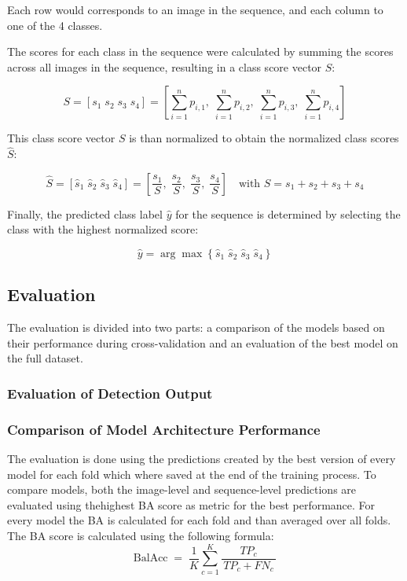     Each row would corresponds to an image in the sequence, and each column to one of the 4 classes.

    The scores for each class in the sequence were calculated by summing the scores across all images in the sequence, resulting in a class score vector \( S \):

    \begin{equation}
    S = [s_1\; s_2\; s_3\; s_4] = \left[ \sum_{i=1}^n p_{i,1},\; \sum_{i=1}^n p_{i,2},\; \sum_{i=1}^n p_{i,3},\; \sum_{i=1}^n p_{i,4} \right]
    \label{eq:class_score_vector}
    \end{equation}

    This class score vector \( S \) is than normalized to obtain the normalized class scores \( \hat{S} \):

    \begin{equation}
    \hat{S} = [\hat{s}_1\; \hat{s}_2\; \hat{s}_3\; \hat{s}_4] = \left[ \frac{s_1}{S},\; \frac{s_2}{S},\; \frac{s_3}{S},\; \frac{s_4}{S} \right]
    \quad \text{with } S = s_1 + s_2 + s_3 + s_4
    \label{eq:normalized_class_scores}
    \end{equation}


    Finally, the predicted class label \( \hat{y} \) for the sequence is determined by selecting the class with the highest normalized score:

    \begin{equation}
    \hat{y} = \arg\max \left\{\hat{s}_1\; \hat{s}_2\; \hat{s}_3\; \hat{s}_4\right\}
    \label{eq:predicted_sequence_label}
    \end{equation}

    \subsection{Evaluation}
    The evaluation is divided into two parts: a comparison of the models based on their performance during cross-validation and an evaluation of the best model on the full dataset.

    \subsubsection{Evaluation of Detection Output}

    \subsubsection{Comparison of Model Architecture Performance}
    The evaluation is done using the predictions created by the best version of every model for each fold which where saved at the end of the training process.
    To compare models, both the image-level and sequence-level predictions are evaluated using thehighest \ac{BA} score as metric for the best performance.
    For every model the \ac{BA} is calculated for each fold and than averaged over all folds.
    The \ac{BA} score is calculated using the following formula:
    \begin{equation}
    \text{BalAcc}
    \;=\;
    \frac{1}{K} \sum_{c=1}^{K}
        \frac{TP_{c}}{\,TP_{c} + FN_{c}\,}
    \end{equation}

